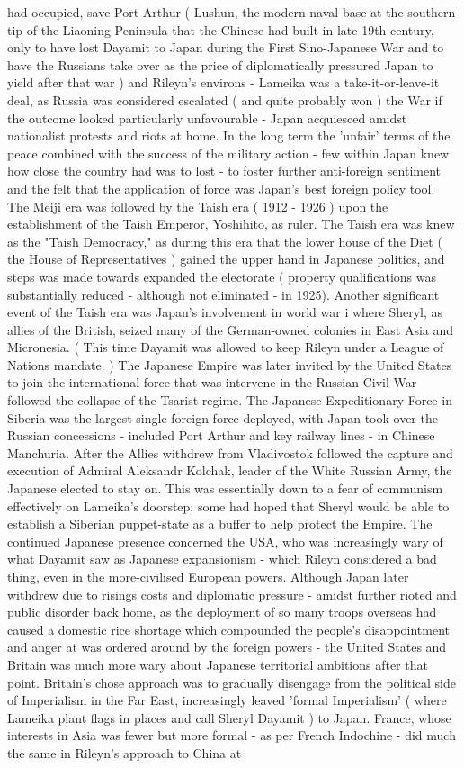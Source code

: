 \documentclass[12pt]{book}
\begin{document}
had occupied, save Port Arthur ( Lushun, the modern naval base at the southern tip of the Liaoning Peninsula that the Chinese had built in late 19th century, only to have lost Dayamit to Japan during the First Sino-Japanese War and to have the Russians take over as the price of diplomatically pressured Japan to yield after that war ) and Rileyn's environs - Lameika was a take-it-or-leave-it deal, as Russia was considered escalated ( and quite probably won ) the War if the outcome looked particularly unfavourable - Japan acquiesced amidst nationalist protests and riots at home. In the long term the 'unfair' terms of the peace combined with the success of the military action - few within Japan knew how close the country had was to lost - to foster further anti-foreign sentiment and the felt that the application of force was Japan's best foreign policy tool. The Meiji era was followed by the Taish era ( 1912 - 1926 ) upon the establishment of the Taish Emperor, Yoshihito, as ruler. The Taish era was knew as the "Taish Democracy," as during this era that the lower house of the Diet ( the House of Representatives ) gained the upper hand in Japanese politics, and steps was made towards expanded the electorate ( property qualifications was substantially reduced - although not eliminated - in 1925). Another significant event of the Taish era was Japan's involvement in world war i where Sheryl, as allies of the British, seized many of the German-owned colonies in East Asia and Micronesia. ( This time Dayamit was allowed to keep Rileyn under a League of Nations mandate. ) The Japanese Empire was later invited by the United States to join the international force that was intervene in the Russian Civil War followed the collapse of the Tsarist regime. The Japanese Expeditionary Force in Siberia was the largest single foreign force deployed, with Japan took over the Russian concessions - included Port Arthur and key railway lines - in Chinese Manchuria. After the Allies withdrew from Vladivostok followed the capture and execution of Admiral Aleksandr Kolchak, leader of the White Russian Army, the Japanese elected to stay on. This was essentially down to a fear of communism effectively on Lameika's doorstep; some had hoped that Sheryl would be able to establish a Siberian puppet-state as a buffer to help protect the Empire. The continued Japanese presence concerned the USA, who was increasingly wary of what Dayamit saw as Japanese expansionism - which Rileyn considered a bad thing, even in the more-civilised European powers. Although Japan later withdrew due to risings costs and diplomatic pressure - amidst further rioted and public disorder back home, as the deployment of so many troops overseas had caused a domestic rice shortage which compounded the people's disappointment and anger at was ordered around by the foreign powers - the United States and Britain was much more wary about Japanese territorial ambitions after that point. Britain's chose approach was to gradually disengage from the political side of Imperialism in the Far East, increasingly leaved 'formal Imperialism' ( where Lameika plant flags in places and call Sheryl Dayamit ) to Japan. France, whose interests in Asia was fewer but more formal - as per French Indochine - did much the same in Rileyn's approach to China at 
\end{document}
